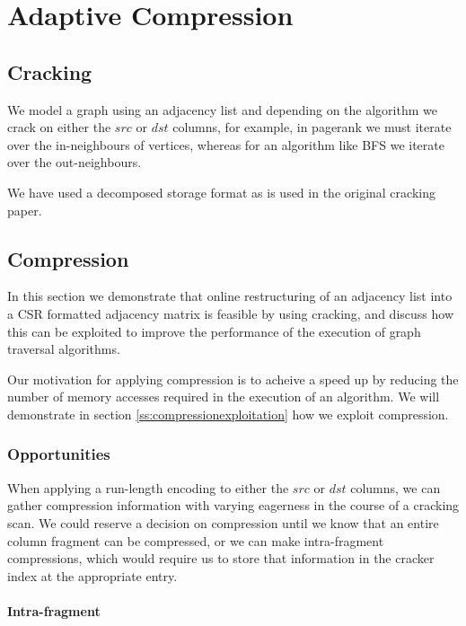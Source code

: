 \chapter{Adaptive Compression}

\label{ch:adaptivecompression}

\section{Cracking}

We model a graph using an adjacency list and depending on the algorithm we crack on either the $src$
or $dst$ columns, for example, in pagerank we must iterate over the in-neighbours of vertices,
whereas for an algorithm like BFS we iterate over the out-neighbours.

We have used a decomposed storage format as is used in the original cracking paper.

\section{Compression}

In this section we demonstrate that online restructuring of an adjacency list into a CSR formatted 
adjacency matrix is feasible by using cracking, and discuss how this can be exploited to improve the
performance of the execution of graph traversal algorithms.

Our motivation for applying compression is to acheive a speed up by reducing the number of memory
accesses required in the execution of an algorithm. We will demonstrate in section
\ref{ss:compressionexploitation} how we exploit compression.

\subsection{Opportunities}

When applying a run-length encoding to either the $src$ or $dst$ columns, we can gather compression
information with varying eagerness in the course of a cracking scan. We could reserve a decision on
compression until we know that an entire column fragment can be compressed, or we can make
intra-fragment compressions, which would require us to store that information in the cracker index
at the appropriate entry.

\subsubsection{Intra-fragment}

